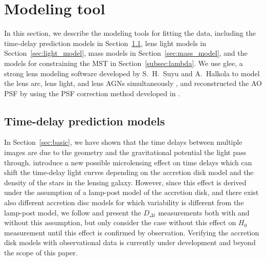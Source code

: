\documentclass[useAMS,usenatbib]{mnras}
\newcommand{\sref}[1]{Section~\ref{#1}}
\newcommand{\Ddt}{D_{\Delta t}}
\begin{document}



\section{Modeling tool}
\label{sec:modeling_tool}
In this section, we describe the modeling tools for fitting the data, including the time-delay prediction models in \sref{sec:Td_model}, lens light models in \sref{sec:light_model}, mass models in \sref{sec:mass_model}, and the models for constraining the MST in \sref{subsec:lambda}.
We use {\sc glee}, a strong lens modeling software developed by S.~H.~Suyu and A.~Halkola to model the lens arc, lens light, and lens AGNs simultaneously \citep{SuyuHalkola10,SuyuEtal12a}, and reconstructed the AO PSF by using the PSF correction method developed in \citet{GChenEtal16}.

\subsection{Time-delay prediction models}
\label{sec:Td_model}
In \sref{sec:basic}, we have shown that the time delays between multiple images are due to the geometry and the gravitational potential the light pass through. \citet{TieKochanek18} introduce a new possible microlensing effect on time delays which can shift the time-delay light curves depending on the accretion disk model and the density of the stars in the lensing galaxy. However, since this effect is derived under the assumption of a lamp-post model of the accretion disk, and there exist also different accretion disc models \citep[e.g.,][]{DexterAgol11} for which variability is different from the lamp-post model, we follow \citet{GChenEtal18a} and present the $\Ddt$ measurements both with and without this assumption, but only consider the case without this effect on $H_{0}$ measurement until this effect is confirmed by observation. Verifying the accretion disk models with observational data is currently under development and beyond the scope of this paper.
\end{document}
